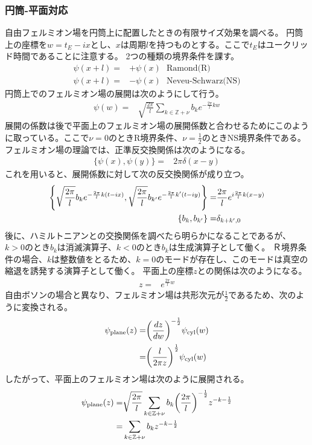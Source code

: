 \documentclass[11pt, dvipdfmx]{article}
\numberwithin{equation}{section}
\begin{document}
\subsubsection{円筒-平面対応}
自由フェルミオン場を円筒上に配置したときの有限サイズ効果を調べる。
円筒上の座標を$w=t_E - i x$とし、$x$は周期$l$を持つものとする。ここで$t_E$はユークリッド時間であることに注意する。
2つの種類の境界条件を課す。
\begin{align}
    \psi(x+l)=& +\psi(x) \ \ \ \text{Ramond(R)}\\
    \psi(x+l)=& -\psi(x) \ \ \ \text{Neveu-Schwarz(NS)}
\end{align}
円筒上でのフェルミオン場の展開は次のようにして行う。
\begin{align}
    \psi(w)=& \sqrt{\frac{2\pi}{l}}\sum_{k\in \mathbb{Z}+\nu}  b_ke^{-\frac{2\pi}{l} k w}
\end{align}
展開の係数は後で平面上のフェルミオン場の展開係数と合わせるためにこのように取っている。ここで$\nu=0$のときR境界条件、$\nu=\frac{1}{2}$のときNS境界条件である。
フェルミオン場の理論では、正準反交換関係は次のようになる。
\begin{align}
    \{\psi(x),\psi(y)\}=&  2\pi\delta(x-y)
\end{align}
これを用いると、展開係数に対して次の反交換関係が成り立つ。
\begin{align}
    \qty{\sqrt{\frac{2\pi}{l}}b_ke^{-\frac{2\pi}{l} k (t-ix)} , \sqrt{\frac{2\pi}{l}}b_{k'}e^{-\frac{2\pi}{l} k' (t-iy)}}=& \frac{2\pi}{l} e^{i\frac{2\pi}{l}k(x-y)}\\
    \qty{b_k , b_{k'}}=&  \delta_{k+k',0}
\end{align}
後に、ハミルトニアンとの交換関係を調べたら明らかになることであるが、$k>0$のとき$b_k$は消滅演算子、$k<0$のとき$b_k$は生成演算子として働く。
Ｒ境界条件の場合、$k$は整数値をとるため、$k=0$のモードが存在し、このモードは真空の縮退を誘発する演算子として働く。
平面上の座標$z$との関係は次のようになる。
\begin{align}
    z=& e^{\frac{2\pi}{l}w}
\end{align}
自由ボソンの場合と異なり、フェルミオン場は共形次元が$\frac{1}{2}$であるため、次のように変換される。
\begin{align}
    \psi_{\text{plane}}(z)=&\qty(\frac{dz}{dw})^{-\frac{1}{2}}\psi_{\text{cyl}}(w)\\
    =&\qty(\frac{l}{2\pi z})^{\frac{1}{2}}\psi_{\text{cyl}}(w)
\end{align}
したがって、平面上のフェルミオン場は次のように展開される。
\begin{align}
    \psi_{\text{plane}}(z)=& \sqrt{\frac{2\pi}{l}}\sum_{k\in \mathbb{Z}+\nu} b_k \qty(\frac{2\pi}{l})^{-\frac{1}{2}} z^{-k-\frac{1}{2}}\\
    =& \sum_{k\in \mathbb{Z}+\nu} b_k z^{-k-\frac{1}{2}}
\end{align}
\end{document}
